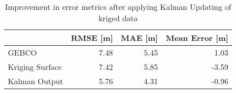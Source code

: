 \begin{table}
\centering
\caption{Improvement in error metrics after applying Kalman Updating of kriged data}
\label{tab:charlotteamalie_gebco_raster_error}
\begin{tabular}{lrrr}
\toprule
 & RMSE [m] & MAE [m] & Mean Error [m] \\
\midrule
GEBCO & 7.48 & 5.45 & 1.03 \\
Kriging Surface & 7.42 & 5.85 & -3.59 \\
Kalman Output & 5.76 & 4.31 & -0.96 \\
\bottomrule
\end{tabular}
\end{table}
